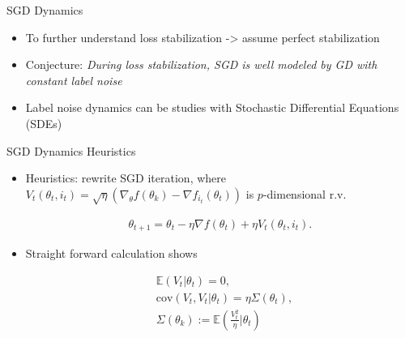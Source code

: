 \documentclass[fleqn]{beamer}
\begin{document}
    \begin{frame}{SGD Dynamics}
        \begin{itemize}[<+->]
            \item To further understand loss stabilization -> assume perfect
                stabilization
            \item Conjecture: \textit{During loss stabilization, SGD is well
                modeled by GD with constant label noise}

            \item Label noise dynamics can be studies with Stochastic
                Differential Equations (SDEs)
        \end{itemize}

    \end{frame}

    \begin{frame}{SGD Dynamics Heuristics}
        \begin{itemize}[<+->]
            \item Heuristics: rewrite SGD iteration, where $V_t(\theta_t, i_t) =
                \sqrt{\eta}\left(\nabla_\theta f(\theta_k) - \nabla
                f_{i_t}(\theta_t)  \right)  $ is $p$-dimensional r.v.
            \begin{center}
            \begin{minipage}{0.5\textwidth}
                \begin{align*}
                    \theta_{t+1} = \theta_t - \eta \nabla f(\theta_t) + \eta
                    V_t(\theta_t, i_t).
                \end{align*}
            \end{minipage}
            \end{center}

        \item Straight forward calculation shows
            \begin{center}
            \begin{minipage}{0.5\textwidth}
                \begin{align*}
                    &\mathbb{E}(V_t|\theta_t) = 0, \\
                    &\text{cov}(V_t, V_t|\theta_t) = \eta \Sigma(\theta_t), \\
                    &\Sigma(\theta_k) :=
                    \mathbb{E}\left(\frac{V_t^{2}}{\eta}\Big|\theta_t \right)
                \end{align*}
            \end{minipage}
            \end{center}
        \end{itemize}
    \end{frame}
\end{document}
